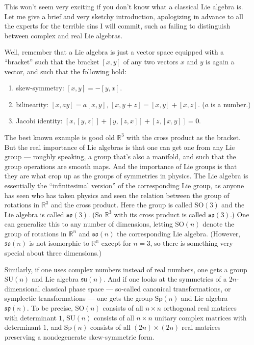 \documentclass[12pt]{article}
\def\tightlist{}
\begin{document}
This won't seem very exciting if you don't know what a classical Lie
algebra is. Let me give a brief and very sketchy introduction,
apologizing in advance to all the experts for the terrible sins I will
commit, such as failing to distinguish between complex and real Lie
algebras.

Well, remember that a Lie algebra is just a vector space equipped with a
``bracket'' such that the bracket \([x,y]\) of any two vectors \(x\) and
\(y\) is again a vector, and such that the following hold:

\begin{enumerate}
\def\labelenumi{\alph{enumi})}
\tightlist
\item
  skew-symmetry: \([x,y] = -[y,x]\).
\item
  bilinearity: \([x,ay] = a[x,y]\), \([x,y+z] = [x,y] + [x,z]\). (\(a\)
  is a number.)
\item
  Jacobi identity: \([x,[y,z]] + [y,[z,x]] + [z,[x,y]] = 0\).
\end{enumerate}

The best known example is good old \(\mathbb{R}^3\) with the cross
product as the bracket. But the real importance of Lie algebras is that
one can get one from any Lie group --- roughly speaking, a group that's
also a manifold, and such that the group operations are smooth maps. And
the importance of Lie groups is that they are what crop up as the groups
of symmetries in physics. The Lie algebra is essentially the
``infinitesimal version'' of the corresponding Lie group, as anyone has
seen who has taken physics and seen the relation between the group of
rotations in \(\mathbb{R}^3\) and the cross product. Here the group is
called \(\mathrm{SO}(3)\) and the Lie algebra is called
\(\mathfrak{so}(3)\). (So \(\mathbb{R}^3\) with its cross product is
called \(\mathfrak{so}(3)\).) One can generalize this to any number of
dimensions, letting \(\mathrm{SO}(n)\) denote the group of rotations in
\(\mathbb{R}^n\) and \(\mathfrak{so}(n)\) the corresponding Lie algebra.
(However, \(\mathfrak{so}(n)\) is not isomorphic to \(\mathbb{R}^n\)
except for \(n = 3\), so there is something very special about three
dimensions.)

Similarly, if one uses complex numbers instead of real numbers, one gets
a group \(\mathrm{SU}(n)\) and Lie algebra \(\mathfrak{su}(n)\). And if
one looks at the symmetries of a \(2n\)-dimensional classical phase
space --- so-called canonical transformations, or symplectic
transformations --- one gets the group \(\mathrm{Sp}(n)\) and Lie
algebra \(\mathfrak{sp}(n)\). To be precise, \(\mathrm{SO}(n)\) consists
of all \(n\times n\) orthogonal real matrices with determinant \(1\),
\(\mathrm{SU}(n)\) consists of all \(n\times n\) unitary complex
matrices with determinant \(1\), and \(\mathrm{Sp}(n)\) consists of all
\((2n)\times(2n)\) real matrices preserving a nondegenerate
skew-symmetric form.
\end{document}
